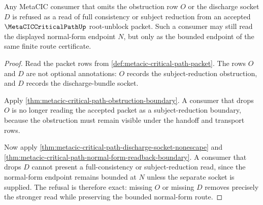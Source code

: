 \begin{theorem}
\label{thm:metacic-critical-path-consumer-refusal-exactness}
Any MetaCIC consumer that omits the obstruction row $O$ or the discharge socket $D$ is refused as a read of full consistency or subject reduction from an accepted $\MetaCICCriticalPathUp$ root-unblock packet. Such a consumer may still read the displayed normal-form endpoint $N$, but only as the bounded endpoint of the same finite route certificate.
\end{theorem}
\begin{proof}
Read the packet rows from \autoref{def:metacic-critical-path-packet}. The rows $O$ and $D$ are not optional annotations: $O$ records the subject-reduction obstruction, and $D$ records the discharge-bundle socket.

Apply \autoref{thm:metacic-critical-path-obstruction-boundary}. A consumer that drops $O$ is no longer reading the accepted packet as a subject-reduction boundary, because the obstruction must remain visible under the handoff and transport rows.

Now apply \autoref{thm:metacic-critical-path-discharge-socket-nonescape} and \autoref{thm:metacic-critical-path-normal-form-readback-boundary}. A consumer that drops $D$ cannot present a full-consistency or subject-reduction read, since the normal-form endpoint remains bounded at $N$ unless the separate socket is supplied. The refusal is therefore exact: missing $O$ or missing $D$ removes precisely the stronger read while preserving the bounded normal-form route.
\end{proof}

